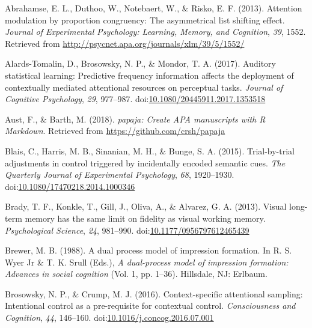 \documentclass[english,,man,floatsintext]{apa6}
\begin{document}
\leavevmode\hypertarget{ref-abrahamse_attention_2013}{}%
Abrahamse, E. L., Duthoo, W., Notebaert, W., \& Risko, E. F. (2013). Attention modulation by proportion congruency: The asymmetrical list shifting effect. \emph{Journal of Experimental Psychology: Learning, Memory, and Cognition}, \emph{39}, 1552. Retrieved from \url{http://psycnet.apa.org/journals/xlm/39/5/1552/}

\leavevmode\hypertarget{ref-alards-tomalin_auditory_2017}{}%
Alards-Tomalin, D., Brosowsky, N. P., \& Mondor, T. A. (2017). Auditory statistical learning: Predictive frequency information affects the deployment of contextually mediated attentional resources on perceptual tasks. \emph{Journal of Cognitive Psychology}, \emph{29}, 977--987. doi:\href{https://doi.org/10.1080/20445911.2017.1353518}{10.1080/20445911.2017.1353518}

\leavevmode\hypertarget{ref-r_papaja_2018}{}%
Aust, F., \& Barth, M. (2018). \emph{papaja: Create APA manuscripts with R Markdown}. Retrieved from \url{https://github.com/crsh/papaja}

\leavevmode\hypertarget{ref-blais_trial-by-trial_2015}{}%
Blais, C., Harris, M. B., Sinanian, M. H., \& Bunge, S. A. (2015). Trial-by-trial adjustments in control triggered by incidentally encoded semantic cues. \emph{The Quarterly Journal of Experimental Psychology}, \emph{68}, 1920--1930. doi:\href{https://doi.org/10.1080/17470218.2014.1000346}{10.1080/17470218.2014.1000346}

\leavevmode\hypertarget{ref-brady_visual_2013}{}%
Brady, T. F., Konkle, T., Gill, J., Oliva, A., \& Alvarez, G. A. (2013). Visual long-term memory has the same limit on fidelity as visual working memory. \emph{Psychological Science}, \emph{24}, 981--990. doi:\href{https://doi.org/10.1177/0956797612465439}{10.1177/0956797612465439}

\leavevmode\hypertarget{ref-brewer_dual_1988}{}%
Brewer, M. B. (1988). A dual process model of impression formation. In R. S. Wyer Jr \& T. K. Srull (Eds.), \emph{A dual-process model of impression formation: Advances in social cognition} (Vol. 1, pp. 1--36). Hillsdale, NJ: Erlbaum.

\leavevmode\hypertarget{ref-brosowsky_context-specific_2016}{}%
Brosowsky, N. P., \& Crump, M. J. (2016). Context-specific attentional sampling: Intentional control as a pre-requisite for contextual control. \emph{Consciousness and Cognition}, \emph{44}, 146--160. doi:\href{https://doi.org/10.1016/j.concog.2016.07.001}{10.1016/j.concog.2016.07.001}
\end{document}
